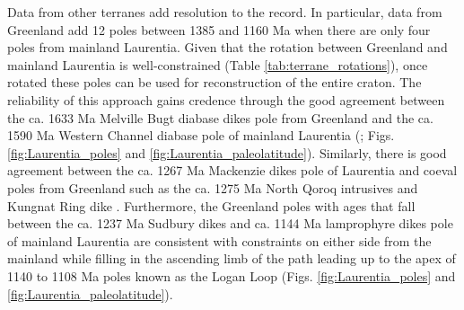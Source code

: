\documentclass[twocolumn, switch]{article} %
\begin{document}
Data from other terranes add resolution to the record. In particular, data from Greenland add 12 poles between 1385 and 1160 Ma when there are only four poles from mainland Laurentia. Given that the rotation between Greenland and mainland Laurentia is well-constrained (Table \ref{tab:terrane_rotations}), once rotated these poles can be used for reconstruction of the entire craton. The reliability of this approach gains credence through the good agreement between the ca. 1633 Ma Melville Bugt diabase dikes pole from Greenland \citep{Halls2011a} and the ca. 1590 Ma Western Channel diabase pole of mainland Laurentia (\citealp{Irving1972a}; Figs. \ref{fig:Laurentia_poles} and \ref{fig:Laurentia_paleolatitude}). Similarly, there is good agreement between the ca. 1267 Ma Mackenzie dikes pole of Laurentia \citep{Buchan2000a} and coeval poles from Greenland such as the ca. 1275 Ma North Qoroq intrusives \citep{Piper1992a} and Kungnat Ring dike \citep{Piper1977a}. Furthermore, the Greenland poles with ages that fall between the ca. 1237 Ma Sudbury dikes and ca. 1144 Ma lamprophyre dikes pole of mainland Laurentia are consistent with constraints on either side from the mainland while filling in the ascending limb of the path leading up to the apex of 1140 to 1108 Ma poles known as the Logan Loop (Figs. \ref{fig:Laurentia_poles} and \ref{fig:Laurentia_paleolatitude}).
\end{document}
